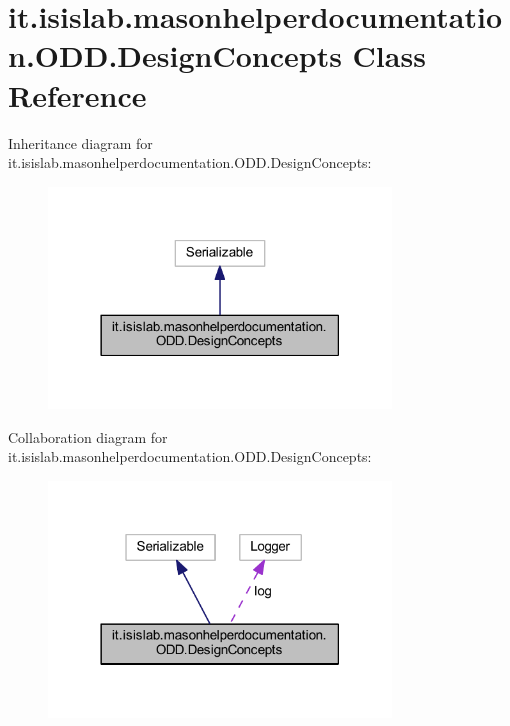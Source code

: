 \hypertarget{classit_1_1isislab_1_1masonhelperdocumentation_1_1_o_d_d_1_1_design_concepts}{\section{it.\-isislab.\-masonhelperdocumentation.\-O\-D\-D.\-Design\-Concepts Class Reference}
\label{classit_1_1isislab_1_1masonhelperdocumentation_1_1_o_d_d_1_1_design_concepts}
}


Inheritance diagram for it.\-isislab.\-masonhelperdocumentation.\-O\-D\-D.\-Design\-Concepts\-:\nopagebreak
\begin{figure}[H]
\begin{center}
\leavevmode
\includegraphics[width=258pt]{classit_1_1isislab_1_1masonhelperdocumentation_1_1_o_d_d_1_1_design_concepts__inherit__graph}
\end{center}
\end{figure}


Collaboration diagram for it.\-isislab.\-masonhelperdocumentation.\-O\-D\-D.\-Design\-Concepts\-:\nopagebreak
\begin{figure}[H]
\begin{center}
\leavevmode
\includegraphics[width=258pt]{classit_1_1isislab_1_1masonhelperdocumentation_1_1_o_d_d_1_1_design_concepts__coll__graph}
\end{center}
\end{figure}
